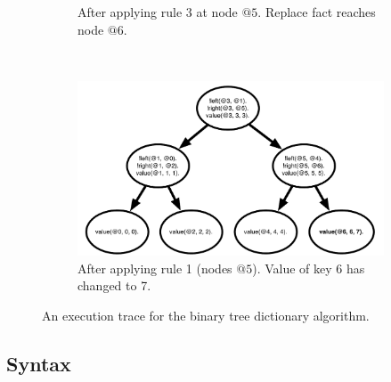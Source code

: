 \begin{figure}[h]
\begin{subfigure}[b]{0.5\textwidth}
                \caption{After applying rule 3 at node $@5$. Replace fact reaches node $@6$.}
                \label{fig:btree_trace3}
        \end{subfigure}%
        ~
        \begin{subfigure}[b]{0.5\textwidth}
                  \includegraphics[width=\textwidth]{btree_trace4}
                  \caption{After applying rule 1 (nodes $@5$). Value of key 6 has changed to 7.}
                  \label{fig:btree_trace4}
          \end{subfigure}
        \caption{An execution trace for the binary tree dictionary algorithm.}\label{fig:btree_trace}
\end{figure}

\subsection{Syntax}

